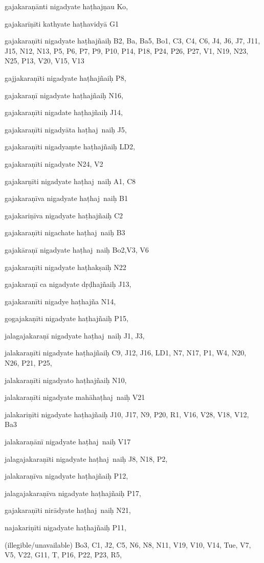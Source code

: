 \begin{marma}[hp02_009]
\begin{marma}[hp02_011]
 \begin{marma}[hp02_26d]
\item[gajakaraṇānti nigadyate haṭhajṇau] Ko,
\item[gajakarīṇīti kathyate haṭhavidyā] G1
\item[gajakaraṇīti nigadyate haṭhajñaiḥ] B2, Ba, Ba5, Bo1, C3, C4, C6, J4, J6, J7, J11, J15, N12, N13, P5, P6, P7, P9, P10, P14, P18, P24, P26, P27, V1, N19, N23, N25, P13, V20, V15, V13
\item[gajjakaraṇīti nigadyate haṭhajñaiḥ] P8, 
\item[gajakaraṇī nigadyate haṭhajñaiḥ] N16, 
\item[gajakaraṇīti nigadate haṭhajñaiḥ] J14,
\item[gajakaraṇīti nigadyāta haṭhaj~naiḥ] J5,
\item[gajakaraṇīti nigadyaṃte haṭhajñaiḥ] LD2,
\item[gajakaraṇīti nigadyate] N24, V2
\item[gajakarṇīti nigadyate haṭhaj~naiḥ] A1, C8
\item[gajakaraṇīva nigadyate haṭhaj~naiḥ] B1
\item[gajakariṇīva nigadyate haṭhajñaiḥ] C2
\item[gajakaraṇīti nigachate haṭhaj~naiḥ] B3
\item[gajakāraṇī nigadyate haṭhaj~naiḥ] Bo2,V3, V6
\item[gajakaraṇīti nigadyate haṭhakṣaiḥ] N22
\item[gajakaraṇī ca nigadyate dṛḍhajñaiḥ] J13,
\item[gajakaranīti nigadye haṭhajña] N14, 
\item[gogajakaṇīti nigadyate haṭhajñaiḥ] P15, 
\item[jalagajakaraṇī nigadyate haṭhaj~naiḥ] J1, J3, 
\item[jalakaraṇīti nigadyate haṭhajñaiḥ] C9, J12, J16, LD1, N7, N17, P1, W4, N20, N26, P21, P25, 
\item[jalakaraṇīti nigadyato haṭhajñaiḥ] N10,
\item[jalakaraṇīti nigadyate mahāhaṭhaj~naiḥ] V21
\item[jalakariṇīti nigadyate haṭhajñaiḥ] J10, J17, N9, P20, R1, V16, V28, V18, V12, Ba3
\item[jalakaraṇānī nigadyate haṭhaj~naiḥ] V17
\item[jalagajakaraṇīti nigadyate haṭhaj~naiḥ] J8, N18, P2,
\item[jalakaraṇīva nigadyate haṭhajñaiḥ] P12,
\item[jalagajakaraṇīva nigadyate haṭhajñaiḥ] P17, 
\item[gajakaraṇīti nirādyate haṭhaj~naiḥ] N21,
\item[najakariṇīti nigadyate haṭhajñaiḥ] P11, 
\item[(illegible/unavailable)] Bo3, C1, J2, C5, N6, N8, N11, V19, V10, V14, Tue, V7, V5, V22, G11, T, P16, P22, P23, R5,
  \begin{description}
    \end{description}
 \end{marma}


\end{marma}
\end{marma}
